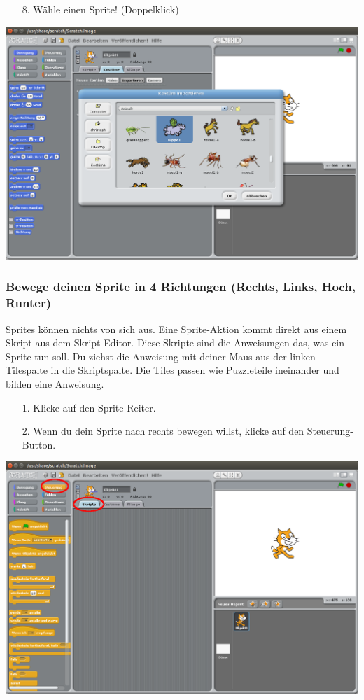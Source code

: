 \begin{itemize}
\item[8.] Wähle einen  Sprite! (Doppelklick)
\end{itemize}

\includegraphics[width=\textwidth]{images/aufgabe1_tiere.png}

\subsubsection{Bewege deinen Sprite in 4 Richtungen (Rechts, Links, Hoch, Runter)}

Sprites können nichts von sich aus. Eine Sprite-Aktion kommt direkt aus einem Skript aus dem Skript-Editor. Diese Skripte sind die Anweisungen das, was ein Sprite tun soll.
Du ziehst die Anweisung mit deiner Maus aus der linken Tilespalte in die Skriptspalte. Die Tiles passen wie Puzzleteile ineinander und bilden eine Anweisung.


\begin{itemize}
\item[1.] Klicke auf den Sprite-Reiter.
\item[2.] Wenn du dein Sprite nach rechts bewegen willst, klicke auf den Steuerung-Button.
\end{itemize}
\includegraphics[width=\textwidth]{images/aufgabe1_steuerung.png}

